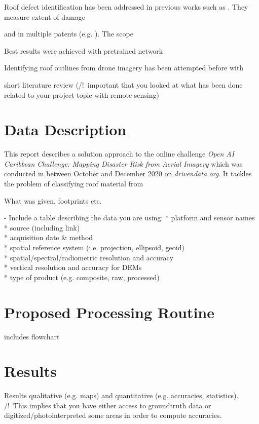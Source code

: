 \documentclass[11pt]{article}
\begin{document}
	Roof defect identification has been addressed in previous works such as \cite{Yudin2018}. They measure extent of damage
	
	 and in multiple patents (e.g. \cite{Shreve2017}). The scope 
	
	Best results were achieved with pretrained network 
	
	Identifying roof outlines from drone imagery has been attempted before with 
	\cite{Soman2019}		
	\cite{Yudin2018}
	\cite{Shreve2017}
		
	short literature review (/!\ important that you looked at what has been done related to your project topic with remote sensing)
	
	\section{Data Description}
	
		This report describes a solution approach to the online challenge \textit{Open AI Caribbean Challenge: Mapping Disaster Risk from Aerial Imagery} which was conducted in between October and December 2020 on \textit{drivendata.org}. It tackles the problem of classifying roof material from 
	
	What was given, footprints etc.
	
	- Include a table describing the data you are using:
	* platform and sensor names \\
	* source (including link) \\
	* acquisition date \& method \\
	* spatial reference system (i.e. projection, ellipsoid, geoid) \\
	* spatial/spectral/radiometric resolution and accuracy \\
	* vertical resolution and accuracy for DEMs \\
	* type of product (e.g. composite, raw, processed) 
	
	\section{Proposed Processing Routine}
	includes flowchart
	
	\section{Results}
	Results qualitative (e.g. maps) and quantitative (e.g. accuracies, statistics). /!\ This implies that you have either access to groundtruth data or digitized/photointerpreted some areas in order to compute accuracies.
	
\end{document}

